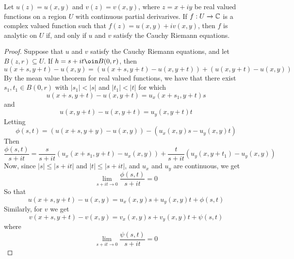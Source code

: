 \begin{theorem}\label{3.2.11}
    Let $u(z)=u(x,y)$ and $v(z)=v(x,y)$, where $z=x+iy$ be real valued
    functions on a region $U$ with continuous partial derivarives. If $f:U
    \xrightarrow{} \mathbb{C}$ is a complex valued function such that
    $f(z)=u(x,y)+iv(x,y)$, then $f$ is analytic on $U$ if, and only if $u$ and
    $v$ satisfy the Cauchy Riemann equations.
\end{theorem}
\begin{proof}
    Suppose that $u$ and  $v$ satisfy the Cauchy Riemann equations, and let
    $B(z,r) \subseteq U$. If $h=s+it \oin B(0,r)$, then
    \begin{equation*}
        u(x+s,y+t)-u(x,y)=(u(x+s,y+t)-u(x,y+t))+(u(x,y+t)-u(x,y))
    \end{equation*}
    By the mean value theorem for real valued functions, we have that there
    exist $s_1, t_1 \in B(0,r)$ with $|s_1|<|s|$ and $|t_1|<|t|$ for which
    \begin{equation*}
        u(x+s,y+t)-u(x,y+t)=u_x(x+s_1,y+t)s
    \end{equation*}
    and
    \begin{equation*}
        u(x,y+t)-u(x,y+t)=u_y(x,y+t)t
    \end{equation*}
    Letting
    \begin{equation*}
        \phi(s,t)=(u(x+s,y+y)-u(x,y))-(u_x(x,y)s-u_y(x,y)t)
    \end{equation*}
    Then
    \begin{equation*}
        \frac{\phi(s,t)}{s+it}=\frac{s}{s+it}(u_x(x+s_1,y+t)-u_x(x,y))+
        \frac{t}{s+it}(u_y(x,y+t_1)-u_y(x,y))
    \end{equation*}
    Now, since $|s| \leq |s+it|$ and  $|t| \leq |s+it|$, and  $u_x$ and  $u_y$
    are continuous, we get
    \begin{equation*}
        \lim_{s+it \xrightarrow{} 0}{\frac{\phi(s,t)}{s+it}}=0
    \end{equation*}
    So that
    \begin{equation*}
        u(x+s,y+t)-u(x,y)=u_x(x,y)s+u_y(x,y)t+\phi(s,t)
    \end{equation*}
    Similarly, for $v$ we get
    \begin{equation*}
        v(x+s,y+t)-v(x,y)=v_x(x,y)s+v_y(x,y)t+\psi(s,t)
    \end{equation*}
    where
    \begin{equation*}
        \lim_{s+it \xrightarrow{} 0}{\frac{\psi(s,t)}{s+it}}=0
    \end{equation*}


\end{proof}
